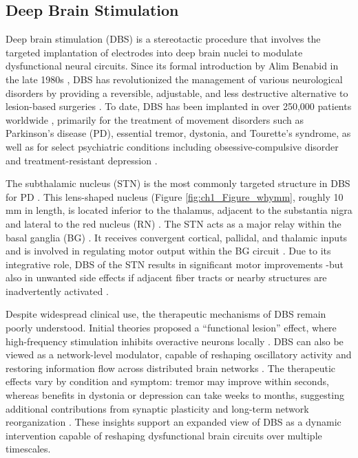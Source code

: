 \subsection{Deep Brain Stimulation}
Deep brain stimulation (DBS) is a stereotactic procedure that involves the targeted implantation of electrodes into deep brain nuclei to modulate dysfunctional neural circuits. Since its formal introduction by Alim Benabid in the late 1980s \cite{Benabid1987-mp}, DBS has revolutionized the management of various neurological disorders by providing a reversible, adjustable, and less destructive alternative to lesion-based surgeries \cite{Limousin1990-oz,The-Deep-Brain-Stimulation-for-Parkinson-s-Disease-Study-Group2001-ss}. To date, DBS has been implanted in over 250,000 patients worldwide \cite{Schulder2023-aj}, primarily for the treatment of movement disorders such as Parkinson's disease (PD), essential tremor, dystonia, and Tourette’s syndrome, as well as for select psychiatric conditions including obsessive-compulsive disorder and treatment-resistant depression \cite{Lozano2019-dv}.

The subthalamic nucleus (STN) is the most commonly targeted structure in DBS for PD \cite{Lozano2019-dv}. This lens-shaped nucleus (Figure \ref{fig:ch1_Figure_whymm}, roughly 10 mm in length, is located inferior to the thalamus, adjacent to the substantia nigra and lateral to the red nucleus (RN) \cite{Prasad2024-hi}. The STN acts as a major relay within the basal ganglia (BG) \cite{DeLong2007-cv}. It receives convergent cortical, pallidal, and thalamic inputs and is involved in regulating motor output within the BG circuit \cite{DeLong2007-cv,Jeon2022-wg}. Due to its integrative role, DBS of the STN results in significant motor improvements \cite{Hermann2024-tr}-but also in unwanted side effects if adjacent fiber tracts or nearby structures are inadvertently activated \cite{Kiss2007-mu,Reich2022-jf}.

Despite widespread clinical use, the therapeutic mechanisms of DBS remain poorly understood. Initial theories proposed a “functional lesion” effect, where high-frequency stimulation inhibits overactive neurons locally \cite{Benabid1987-mp, Benabid1996-jd}. DBS can also be viewed as a network-level modulator, capable of reshaping oscillatory activity and restoring information flow across distributed brain networks \cite{Miocinovic2013-rs,Herrington2016-xr}. The therapeutic effects vary by condition and symptom: tremor may improve within seconds, whereas benefits in dystonia or depression can take weeks to months, suggesting additional contributions from synaptic plasticity and long-term network reorganization \cite{Ashkan2017-hb}. These insights support an expanded view of DBS as a dynamic intervention capable of reshaping dysfunctional brain circuits over multiple timescales.

